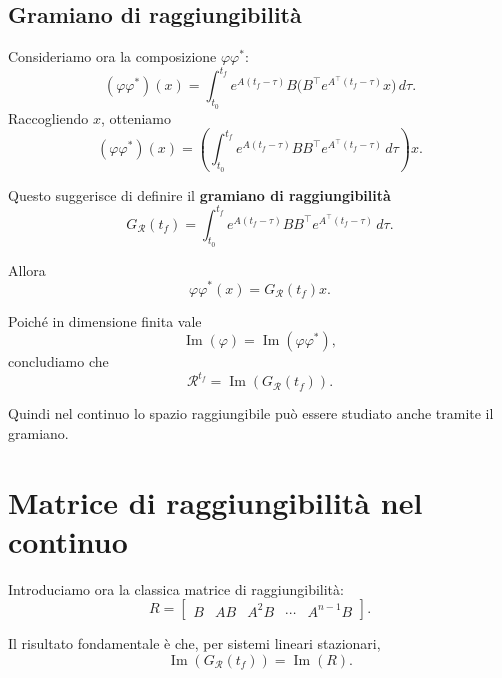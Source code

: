 \subsection{Gramiano di raggiungibilità}

Consideriamo ora la composizione \(\varphi\varphi^\ast\):
\[
(\varphi\varphi^\ast)(x)
=
\int_{t_0}^{t_f}
e^{A(t_f-\tau)}B\Big(B^\top e^{A^\top(t_f-\tau)}x\Big)\,d\tau.
\]
Raccogliendo \(x\), otteniamo
\[
(\varphi\varphi^\ast)(x)
=
\left(
\int_{t_0}^{t_f}
e^{A(t_f-\tau)}BB^\top e^{A^\top(t_f-\tau)}\,d\tau
\right)x.
\]

Questo suggerisce di definire il \textbf{gramiano di raggiungibilità}
\begin{equation}
G_{\mathcal R}(t_f)
=
\int_{t_0}^{t_f}
e^{A(t_f-\tau)}BB^\top e^{A^\top(t_f-\tau)}\,d\tau.
\label{eq:L11_gramiano}
\end{equation}

Allora
\begin{equation}
\varphi\varphi^\ast(x)=G_{\mathcal R}(t_f)x.
\label{eq:L11_phi_phi_star}
\end{equation}

Poiché in dimensione finita vale
\[
\operatorname{Im}(\varphi)=\operatorname{Im}(\varphi\varphi^\ast),
\]
concludiamo che
\begin{equation}
\mathcal{R}^{t_f}
=
\operatorname{Im}(G_{\mathcal R}(t_f)).
\label{eq:L11_Rtf_gramiano}
\end{equation}

Quindi nel continuo lo spazio raggiungibile può essere studiato anche tramite il gramiano.

\section{Matrice di raggiungibilità nel continuo}

Introduciamo ora la classica matrice di raggiungibilità:
\begin{equation}
R=
\begin{bmatrix}
B & AB & A^2B & \cdots & A^{n-1}B
\end{bmatrix}.
\label{eq:L11_matrice_raggiungibilita}
\end{equation}

Il risultato fondamentale è che, per sistemi lineari stazionari,
\begin{equation}
\operatorname{Im}(G_{\mathcal R}(t_f))=\operatorname{Im}(R).
\label{eq:L11_gramiano_matrice}
\end{equation}

